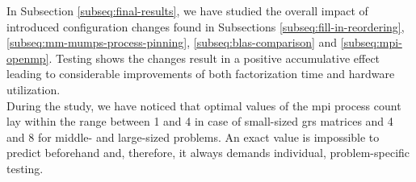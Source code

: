 



In Subsection \ref{subseq:final-results}, we have studied the overall impact of introduced configuration changes found in Subsections \ref{subseq:fill-in-reordering}, \ref{subseq:mm-mumps-process-pinning}, \ref{subseq:blas-comparison} and \ref{subseq:mpi-openmp}. Testing shows the changes result in a positive accumulative effect leading to considerable improvements of both factorization time and hardware utilization.\\



During the study, we have noticed that optimal values of the \acrshort{mpi} process count lay within the range between 1 and 4 in case of small-sized \acrshort{grs} matrices and 4 and 8 for middle- and large-sized problems. An exact value is impossible to predict beforehand and, therefore, it always demands individual, problem-specific testing.\\
